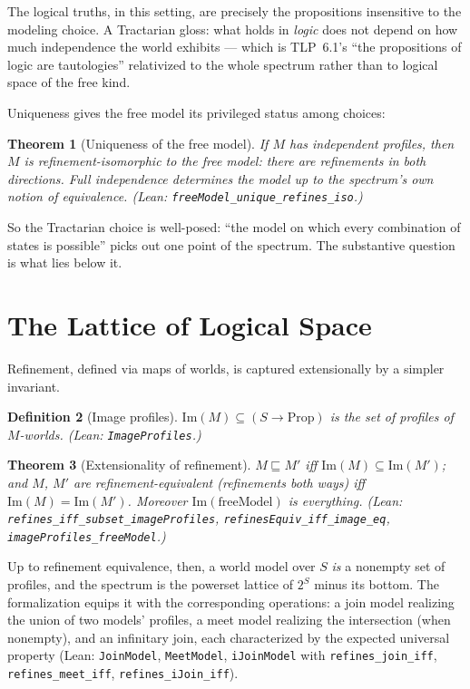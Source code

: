 \documentclass[10pt, letterpaper]{article}
\newtheorem{theorem}{Theorem}[section]
\newtheorem{definition}[theorem]{Definition}
\theoremstyle{remark}
\newcommand{\lean}[1]{\texttt{#1}}
\newcommand{\TLP}[1]{TLP~#1}
\begin{document}
The logical truths, in this setting, are precisely the propositions
insensitive to the modeling choice. A Tractarian gloss: what holds in
\emph{logic} does not depend on how much independence the world exhibits ---
which is \TLP{6.1}'s ``the propositions of logic are tautologies'' relativized
to the whole spectrum rather than to logical space of the free kind.

Uniqueness gives the free model its privileged status among choices:

\begin{theorem}[Uniqueness of the free model]\label{thm:unique}
If $M$ has independent profiles, then $M$ is refinement-isomorphic to the
free model: there are refinements in both directions. Full independence
determines the model up to the spectrum's own notion of equivalence. (Lean:
\lean{freeModel\_unique\_refines\_iso}.)
\end{theorem}

So the Tractarian choice is well-posed: ``the model on which every
combination of states is possible'' picks out one point of the spectrum. The
substantive question is what lies below it.

\section{The Lattice of Logical Space}\label{sec:lattice}

Refinement, defined via maps of worlds, is captured extensionally by a
simpler invariant.

\begin{definition}[Image profiles]\label{def:image}
$\mathrm{Im}(M) \subseteq (S \to \mathrm{Prop})$ is the set of profiles of
$M$-worlds. (Lean: \lean{ImageProfiles}.)
\end{definition}

\begin{theorem}[Extensionality of refinement]\label{thm:image}
$M \sqsubseteq M'$ iff $\mathrm{Im}(M) \subseteq \mathrm{Im}(M')$; and $M$,
$M'$ are refinement-equivalent (refinements both ways) iff
$\mathrm{Im}(M) = \mathrm{Im}(M')$. Moreover
$\mathrm{Im}(\mathrm{freeModel}) $ is everything. (Lean:
\lean{refines\_iff\_subset\_imageProfiles},
\lean{refinesEquiv\_iff\_image\_eq}, \lean{imageProfiles\_freeModel}.)
\end{theorem}

Up to refinement equivalence, then, a world model over $S$ \emph{is} a
nonempty set of profiles, and the spectrum is the powerset lattice of
$2^S$ minus its bottom. The formalization equips it with the corresponding
operations: a join model realizing the union of two models' profiles, a meet
model realizing the intersection (when nonempty), and an infinitary join,
each characterized by the expected universal property (Lean:
\lean{JoinModel}, \lean{MeetModel}, \lean{iJoinModel} with
\lean{refines\_join\_iff}, \lean{refines\_meet\_iff},
\lean{refines\_iJoin\_iff}).
\end{document}
